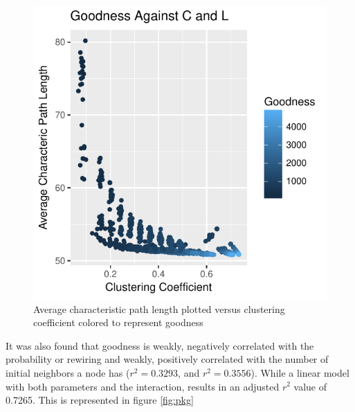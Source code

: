 \documentclass{article}
\begin{document}
\begin{figure}
\centering
\includegraphics[width=1\textwidth]{8-cpl_vs_clus_G_col.pdf}
\caption{\label{fig:ccg}Average characteristic path length plotted versus clustering coefficient colored to represent goodness}
\end{figure}


It was also found that goodness is weakly, negatively correlated with the probability or rewiring and weakly, positively correlated with the number of initial neighbors a node has ($r^2 = 0.3293$, and $r^2 = 0.3556$). While a linear model with both parameters and the interaction, results in an adjusted $r^2$ value of 0.7265. This is represented in figure \ref{fig:pkg}
\end{document}
